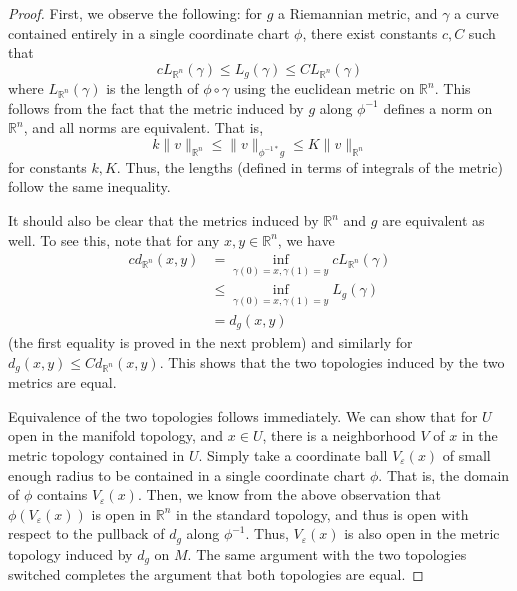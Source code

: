 \documentclass[fontsize=11pt]{scrartcl} %
\numberwithin{equation}{section} %
\numberwithin{figure}{section} %
\numberwithin{table}{section} %
\newcommand{\R}{\mathbb{R}}
\begin{document}
\begin{proof}
    First, we observe the following: for $g$ a Riemannian metric, and $\gamma$ a
    curve contained entirely in a single coordinate chart $\phi$, there exist
    constants $c,C$ such that
    \[
        cL_{\R^n}(\gamma) \leq L_g(\gamma) \leq CL_{\R^n}(\gamma)
    \]
    where $L_{\R^n}(\gamma)$ is the length of $\phi\circ\gamma$ using the
    euclidean metric on $\R^n$.  This follows from the fact that the
    metric induced by $g$ along $\phi^{-1}$ defines a norm on $\R^n$, and all
    norms are equivalent. That is,
    \[
        k\|v\|_{\R^n} \leq \|v\|_{\phi^{-1*}g}\leq K\|v\|_{\R^n}
    \]
    for constants $k,K$. Thus, the lengths (defined in terms of integrals of the
    metric) follow the same inequality. 

    It should also be clear that the metrics induced by $\R^n$ and $g$ are
    equivalent as well. To see this, note that for any $x,y\in \R^n$, we have
    \[
        \begin{aligned}
        cd_{\R^n}(x,y) &= \inf_{\gamma(0)=x,\gamma(1)=y}cL_{\R^n}(\gamma)\\
        &\leq \inf_{\gamma(0)=x,\gamma(1)=y}L_g(\gamma)\\
        &=d_g(x,y)
    \end{aligned}
    \]
    (the first equality is proved in the next problem)
    and similarly for $d_g(x,y)\leq Cd_{\R^n}(x,y)$. This shows that the two
    topologies induced by the two metrics are equal.

    Equivalence of the two topologies follows immediately. We can show that for
    $U$ open in the manifold topology, and $x\in U$, there is a neighborhood $V$
    of $x$ in the metric topology contained in $U$. Simply take a coordinate
    ball $V_{\varepsilon}(x)$ of small enough radius to be contained in a single
    coordinate chart $\phi$. That is, the domain of $\phi$ contains
    $V_{\varepsilon}(x)$. Then, we know from the above observation that
    $\phi(V_{\varepsilon}(x))$ is open in $\R^n$ in the standard topology, and
    thus is open with respect to the pullback of $d_g$ along $\phi^{-1}$. Thus,
    $V_{\varepsilon}(x)$ is also open in the metric topology induced by $d_g$ on
    $M$. The same argument with the two topologies switched completes the
    argument that both topologies are equal.
\end{proof}
\end{document}
